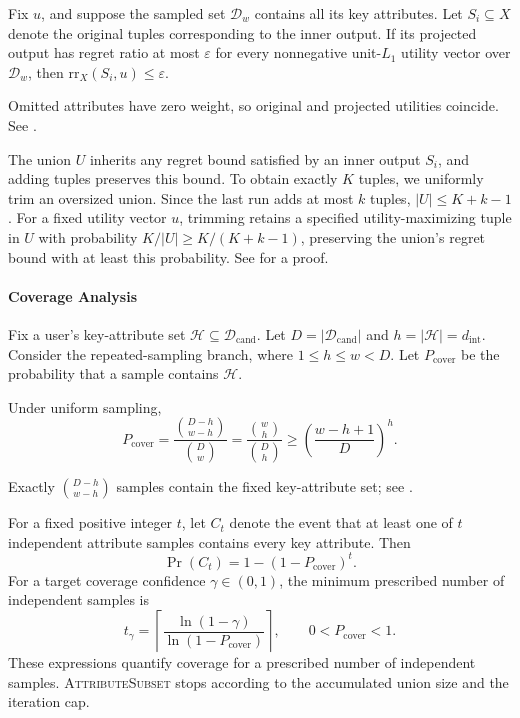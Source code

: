\begin{theorem}\label{theorem_att}
    Fix $u$, and suppose the sampled set $\mathcal{D}_w$ contains all its key attributes. Let $S_i\subseteq X$ denote the original tuples corresponding to the inner output. If its projected output has regret ratio at most $\varepsilon$ for every nonnegative unit-$L_1$ utility vector over $\mathcal{D}_w$, then $\mathrm{rr}_X(S_i,u)\leq\varepsilon$.
\end{theorem}

Omitted attributes have zero weight, so original and projected utilities coincide. See \iftoggle{TechnicalReport}{Section~\ref{appen:proof} of the \technicalreport}{Appendix~\ref{appen:proof}}.

The union $U$ inherits any regret bound satisfied by an inner output $S_i$, and adding tuples preserves this bound. To obtain exactly $K$ tuples, we uniformly trim an oversized union. Since the last run adds at most $k$ tuples, $|U|\leq K+k-1$. For a fixed utility vector $u$, trimming retains a specified utility-maximizing tuple in $U$ with probability $K/|U|\geq K/(K+k-1)$, preserving the union's regret bound with at least this probability. See \iftoggle{TechnicalReport}{Section~\ref{appen:proof} of the \technicalreport}{Appendix~\ref{appen:proof}} for a proof.

\paragraph{\textbf{Coverage Analysis}}
Fix a user's key-attribute set $\mathcal{H}\subseteq\mathcal{D}_\text{cand}$. Let $D=|\mathcal{D}_\text{cand}|$ and $h=|\mathcal{H}|=d_\text{int}$. Consider the repeated-sampling branch, where $1\leq h\leq w<D$. Let $P_\text{cover}$ be the probability that a sample contains $\mathcal{H}$.
\begin{lemma}\label{lemma_p}
    Under uniform sampling,
    \[
    P_\text{cover}=\frac{\binom{D-h}{w-h}}{\binom Dw}
    =\frac{\binom wh}{\binom Dh}
    \geq\left(\frac{w-h+1}{D}\right)^h.
    \]
\end{lemma}

Exactly $\binom{D-h}{w-h}$ samples contain the fixed key-attribute set; see \iftoggle{TechnicalReport}{Section~\ref{appen:proof} of the \technicalreport}{Appendix~\ref{appen:proof}}.

For a fixed positive integer $t$, let $C_t$ denote the event that at least one of $t$ independent attribute samples contains every key attribute. Then
\[
\Pr(C_t)=1-(1-P_\text{cover})^t.
\]
For a target coverage confidence $\gamma\in(0,1)$, the minimum prescribed number of independent samples is
\[
t_\gamma=\left\lceil\frac{\ln(1-\gamma)}{\ln(1-P_\text{cover})}\right\rceil,
\qquad 0<P_\text{cover}<1.
\]
These expressions quantify coverage for a prescribed number of independent samples. \textsc{AttributeSubset} stops according to the accumulated union size and the iteration cap.

